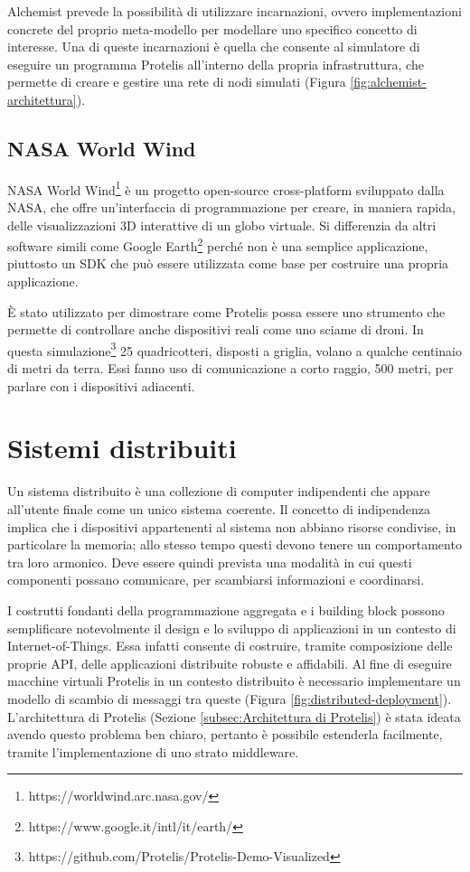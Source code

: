Alchemist prevede la possibilità di utilizzare incarnazioni, ovvero
implementazioni concrete del proprio meta-modello per modellare uno specifico
concetto di interesse. Una di queste incarnazioni è quella che consente al
simulatore di eseguire un programma Protelis all'interno della propria
infrastruttura, che permette di creare e gestire una rete di nodi simulati
(Figura \ref{fig:alchemist-architettura}).

\subsection{NASA World Wind}
NASA World Wind\footnote{https://worldwind.arc.nasa.gov/} è un progetto
open-source cross-platform sviluppato dalla NASA, che offre un'interfaccia di
programmazione per creare, in maniera rapida, delle visualizzazioni 3D
interattive di un globo virtuale. Si differenzia da altri software simili come
Google Earth\footnote{https://www.google.it/intl/it/earth/} perché non è una
semplice applicazione, piuttosto un SDK che può essere utilizzata come
base per costruire una propria applicazione.

È stato utilizzato per dimostrare come Protelis possa essere uno strumento che
permette di controllare anche dispositivi reali come uno sciame di droni. In
questa
simulazione\footnote{https://github.com/Protelis/Protelis-Demo-Visualized} 25
quadricotteri, disposti a griglia, volano a qualche centinaio di metri da
terra. Essi fanno uso di comunicazione a corto raggio, 500 metri, per parlare
con i dispositivi adiacenti.

\section{Sistemi distribuiti}

Un sistema distribuito è una collezione di computer indipendenti che appare
all'utente finale come un unico sistema coerente\cite{tanenbaum2016}.  Il
concetto di indipendenza implica che i dispositivi appartenenti al sistema non
abbiano risorse condivise, in particolare la memoria; allo stesso tempo questi
devono tenere un comportamento tra loro armonico. Deve essere quindi prevista
una modalità in cui questi componenti possano comunicare, per scambiarsi
informazioni e coordinarsi.

I costrutti fondanti della programmazione aggregata e i building block possono
semplificare notevolmente il design e lo sviluppo di applicazioni in un contesto
di Internet-of-Things\cite{DBLP:journals/computer/BealPV15}. Essa infatti
consente di costruire, tramite composizione delle proprie API, delle
applicazioni distribuite robuste e affidabili. Al fine di eseguire macchine
virtuali Protelis in un contesto distribuito è necessario implementare un
modello di scambio di messaggi tra queste (Figura
\ref{fig:distributed-deployment}).  L'architettura di Protelis (Sezione
\ref{subsec:Architettura di Protelis}) è stata ideata avendo questo problema ben
chiaro, pertanto è possibile estenderla facilmente, tramite l'implementazione di
uno strato middleware.


